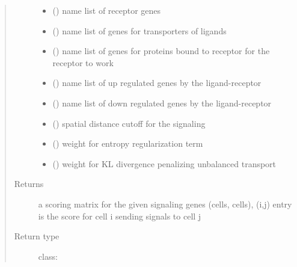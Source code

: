 \documentclass[letterpaper,10pt,english]{sphinxmanual}
\begin{document}
\begin{fulllineitems}
\begin{fulllineitems}
\begin{quote}
\begin{description}
\begin{itemize}
\item {} 
 () \textendash{} name list of receptor genes

\item {} 
 (\sphinxstyleliteralemphasis{, }) \textendash{} name list of genes for transporters of ligands

\item {} 
 (\sphinxstyleliteralemphasis{, }) \textendash{} name list of genes for proteins bound to receptor for the receptor to work

\item {} 
 () \textendash{} name list of up regulated genes by the ligand-receptor

\item {} 
 () \textendash{} name list of down regulated genes by the ligand-receptor

\item {} 
 () \textendash{} spatial distance cutoff for the signaling

\item {} 
 (\sphinxstyleliteralemphasis{, }) \textendash{} weight for entropy regularization term

\item {} 
 (\sphinxstyleliteralemphasis{, }) \textendash{} weight for KL divergence penalizing unbalanced transport

\end{itemize}

\item[{Returns}] \leavevmode
a scoring matrix for the given signaling genes (cells, cells), (i,j) entry is the score for cell i sending signals to cell j

\item[{Return type}] \leavevmode
class:


\end{description}
\end{quote}
\end{fulllineitems}
\end{fulllineitems}
\end{document}

